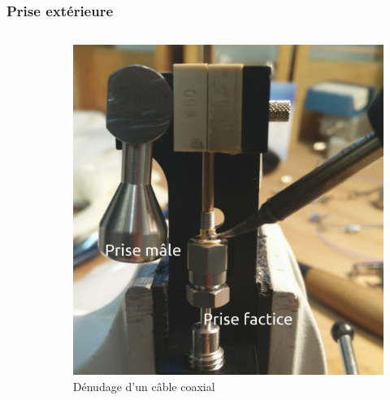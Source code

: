 \documentclass[8pt,a9paper]{beamer} \usepackage[utf8]{inputenc} \usepackage[francais]{babel} \usepackage[T1]{fontenc}
\begin{document}
\begin{frame}
\frametitle{Prise extérieure}
\begin{columns}
\begin{column}{0.7\textwidth}
    \begin{description}
        \item[]~\\
    \end{description}
\end{column}
\begin{column}{0.3\textwidth}
\begin{figure}[h]
    \begin{center}
        \includegraphics[width=\textwidth]{Images/Coax/4}
        \caption{Dénudage d'un câble coaxial}
    \end{center}
\end{figure}
\end{column}
\end{columns}
\end{frame}
\end{document}
